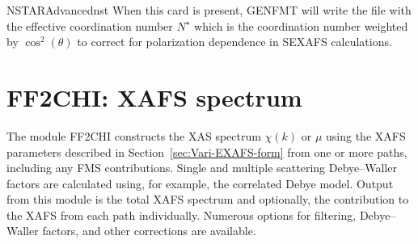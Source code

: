 \documentclass[11pt,oneside]{report} %
\begin{document}
\begin{Card}{NSTAR}{}{Advanced}{nst}
  When this card is present, GENFMT will write the file
   with the effective coordination number $N^\star$
  which is the coordination number weighted by $\cos^2(\theta)$ to
  correct for polarization dependence in SEXAFS calculations.
\end{Card}




\section{FF2CHI: XAFS spectrum}
\label{sec:Comb-contr-from}

The module FF2CHI constructs the XAS spectrum $\chi(k)$ or $\mu$ using the
XAFS parameters described in Section~\ref{sec:Vari-EXAFS-form} from
one or more paths, including any FMS contributions.
Single and multiple scattering Debye--Waller
factors are calculated using, for example, the correlated Debye model.
Output from this module is the total XAFS spectrum and optionally, the
contribution to the XAFS from each path individually.  Numerous
options for filtering, Debye--Waller factors, and other corrections are
available.
\end{document}
